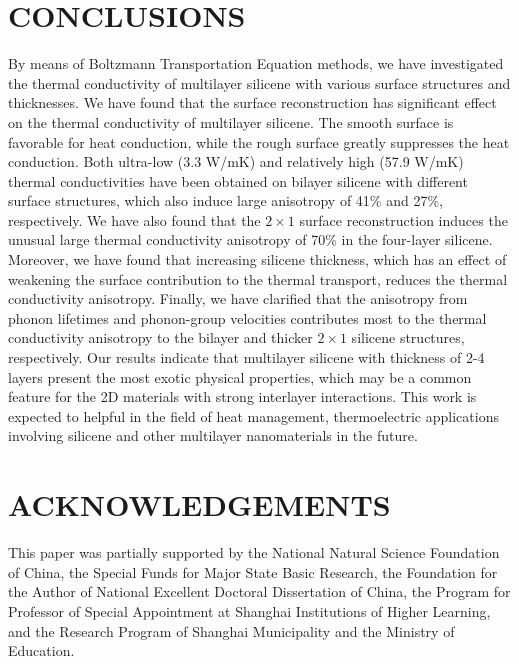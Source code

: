 \documentclass[aps,prb,twocolumn,showpacs,amsmath,amssymb]{revtex4-1}
\begin{document}
\section{CONCLUSIONS}
By means of Boltzmann Transportation Equation methods, we have investigated the thermal conductivity of multilayer silicene with various surface structures and thicknesses.
We have found that the surface reconstruction has significant effect on the thermal conductivity of multilayer silicene.  The smooth surface is favorable for heat conduction, while the rough surface greatly suppresses the heat conduction. Both ultra-low (3.3 W/mK) and relatively high (57.9 W/mK) thermal conductivities have been obtained on bilayer silicene with different surface structures, which also induce large anisotropy of 41\% and 27\%, respectively. We have also found that the $2 \times 1$ surface reconstruction induces the unusual large thermal conductivity anisotropy of 70\%  in the four-layer silicene.  Moreover, we have found that increasing silicene thickness, which has an effect of weakening the surface contribution to the thermal transport, reduces the thermal conductivity anisotropy. Finally, we have clarified that the anisotropy from phonon lifetimes and phonon-group velocities contributes most to the thermal conductivity anisotropy to the bilayer and thicker $2\times 1$ silicene structures, respectively. Our results indicate that multilayer silicene with thickness of 2-4 layers present the most exotic physical properties, which may be a common feature for the 2D materials with strong interlayer interactions.
This work is expected to helpful in the field of heat management, thermoelectric applications involving silicene and other multilayer nanomaterials in the future.


\section{ACKNOWLEDGEMENTS}
This paper was partially supported by the National Natural Science Foundation of China, the Special Funds for Major State Basic Research, the Foundation for the Author of National Excellent Doctoral Dissertation of China, the Program for Professor of Special Appointment at Shanghai Institutions of Higher Learning, and the Research Program of Shanghai Municipality and the Ministry of Education.



\end{document}
